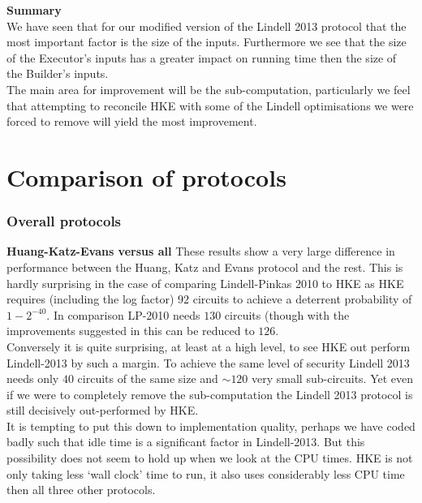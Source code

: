 \documentclass[ %
                    author={Nicholas Tutte},
                supervisor={Prof. Nigel Smart},
                    degree={MEng},
                     title={Secure Two Party Computation},
                  subtitle={A practical comparison of recent protocols},
                      type={Research - GG1K},
                      year={2015} ]{dissertation}
\begin{document}
				\noindent \textbf{Summary}\\
					We have seen that for our modified version of the Lindell 2013 protocol that the most important factor is the size of the inputs. Furthermore we see that the size of the Executor's inputs has a greater impact on running time then the size of the Builder's inputs.\\

					The main area for improvement will be the sub-computation, particularly we feel that attempting to reconcile HKE with some of the Lindell optimisations we were forced to remove will yield the most improvement.

			\FloatBarrier
			\section{Comparison of protocols}
				\subsubsection{Overall protocols} \label{sub:Overall_Comparisons}

					\noindent \textbf{Huang-Katz-Evans versus all} These results show a very large difference in performance between the Huang, Katz and Evans protocol and the rest. This is hardly surprising in the case of comparing Lindell-Pinkas 2010 to HKE as HKE requires (including the log factor) $92$ circuits to achieve a deterrent probability of $1 - 2^{-40}$. In comparison LP-2010 needs $130$ circuits (though with the improvements suggested in \cite{ShelatAndShen} this can be reduced to $126$.\\

					Conversely it is quite surprising, at least at a high level, to see HKE out perform Lindell-2013 by such a margin. To achieve the same level of security Lindell 2013 needs only $40$ circuits of the same size and $\sim 120$ very small sub-circuits. Yet even if we were to completely remove the sub-computation the Lindell 2013 protocol is still decisively out-performed by HKE.\\

					It is tempting to put this down to implementation quality, perhaps we have coded badly such that idle time is a significant factor in Lindell-2013. But this possibility does not seem to hold up when we look at the CPU times. HKE is not only taking less `wall clock' time to run, it also uses considerably less CPU time then all three other protocols.\\
\end{document}
